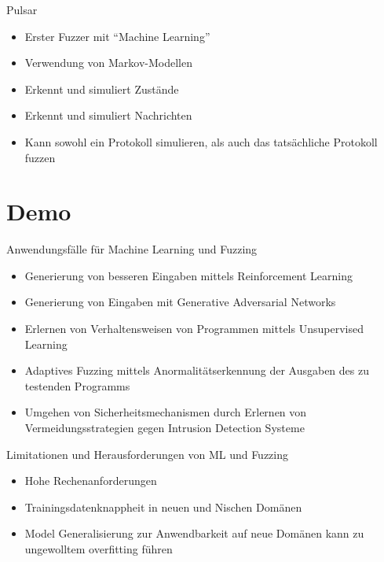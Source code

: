 \begin{frame}{Pulsar}
    \begin{itemize}
        \item Erster Fuzzer mit \enquote{Machine Learning}
        \item Verwendung von Markov-Modellen
        \item Erkennt und simuliert Zustände
        \item Erkennt und simuliert Nachrichten
        \item Kann sowohl ein Protokoll simulieren, als auch das tatsächliche Protokoll fuzzen
    \end{itemize}
\end{frame}
\section{Demo}\label{sec:demo}
\begin{frame}{Anwendungsfälle für Machine Learning und Fuzzing}
    \begin{itemize}
        \item Generierung von besseren Eingaben mittels Reinforcement Learning
        \item Generierung von Eingaben mit Generative Adversarial Networks
        \item Erlernen von Verhaltensweisen von Programmen mittels Unsupervised Learning
        \item Adaptives Fuzzing mittels Anormalitätserkennung der Ausgaben des zu testenden Programms
        \item Umgehen von Sicherheitsmechanismen durch Erlernen von Vermeidungsstrategien gegen Intrusion Detection Systeme
    \end{itemize}
\end{frame}
\begin{frame}{Limitationen und Herausforderungen von ML und Fuzzing}
    \begin{itemize}
        \item Hohe Rechenanforderungen
        \item Trainingsdatenknappheit in neuen und Nischen Domänen
        \item Model Generalisierung zur Anwendbarkeit auf neue Domänen kann zu ungewolltem overfitting führen
    \end{itemize}
\end{frame}
